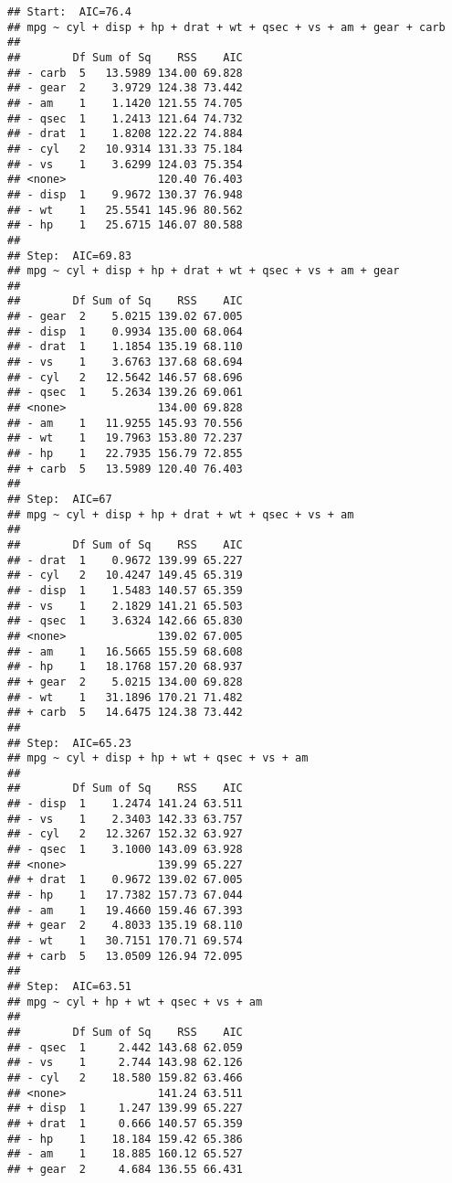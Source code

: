 \documentclass[
]{article}
\begin{document}
\begin{verbatim}
## Start:  AIC=76.4
## mpg ~ cyl + disp + hp + drat + wt + qsec + vs + am + gear + carb
## 
##        Df Sum of Sq    RSS    AIC
## - carb  5   13.5989 134.00 69.828
## - gear  2    3.9729 124.38 73.442
## - am    1    1.1420 121.55 74.705
## - qsec  1    1.2413 121.64 74.732
## - drat  1    1.8208 122.22 74.884
## - cyl   2   10.9314 131.33 75.184
## - vs    1    3.6299 124.03 75.354
## <none>              120.40 76.403
## - disp  1    9.9672 130.37 76.948
## - wt    1   25.5541 145.96 80.562
## - hp    1   25.6715 146.07 80.588
## 
## Step:  AIC=69.83
## mpg ~ cyl + disp + hp + drat + wt + qsec + vs + am + gear
## 
##        Df Sum of Sq    RSS    AIC
## - gear  2    5.0215 139.02 67.005
## - disp  1    0.9934 135.00 68.064
## - drat  1    1.1854 135.19 68.110
## - vs    1    3.6763 137.68 68.694
## - cyl   2   12.5642 146.57 68.696
## - qsec  1    5.2634 139.26 69.061
## <none>              134.00 69.828
## - am    1   11.9255 145.93 70.556
## - wt    1   19.7963 153.80 72.237
## - hp    1   22.7935 156.79 72.855
## + carb  5   13.5989 120.40 76.403
## 
## Step:  AIC=67
## mpg ~ cyl + disp + hp + drat + wt + qsec + vs + am
## 
##        Df Sum of Sq    RSS    AIC
## - drat  1    0.9672 139.99 65.227
## - cyl   2   10.4247 149.45 65.319
## - disp  1    1.5483 140.57 65.359
## - vs    1    2.1829 141.21 65.503
## - qsec  1    3.6324 142.66 65.830
## <none>              139.02 67.005
## - am    1   16.5665 155.59 68.608
## - hp    1   18.1768 157.20 68.937
## + gear  2    5.0215 134.00 69.828
## - wt    1   31.1896 170.21 71.482
## + carb  5   14.6475 124.38 73.442
## 
## Step:  AIC=65.23
## mpg ~ cyl + disp + hp + wt + qsec + vs + am
## 
##        Df Sum of Sq    RSS    AIC
## - disp  1    1.2474 141.24 63.511
## - vs    1    2.3403 142.33 63.757
## - cyl   2   12.3267 152.32 63.927
## - qsec  1    3.1000 143.09 63.928
## <none>              139.99 65.227
## + drat  1    0.9672 139.02 67.005
## - hp    1   17.7382 157.73 67.044
## - am    1   19.4660 159.46 67.393
## + gear  2    4.8033 135.19 68.110
## - wt    1   30.7151 170.71 69.574
## + carb  5   13.0509 126.94 72.095
## 
## Step:  AIC=63.51
## mpg ~ cyl + hp + wt + qsec + vs + am
## 
##        Df Sum of Sq    RSS    AIC
## - qsec  1     2.442 143.68 62.059
## - vs    1     2.744 143.98 62.126
## - cyl   2    18.580 159.82 63.466
## <none>              141.24 63.511
## + disp  1     1.247 139.99 65.227
## + drat  1     0.666 140.57 65.359
## - hp    1    18.184 159.42 65.386
## - am    1    18.885 160.12 65.527
## + gear  2     4.684 136.55 66.431

\end{verbatim}
\end{document}
